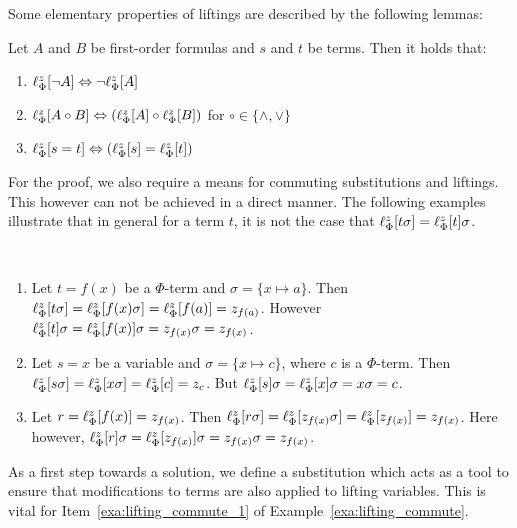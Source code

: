Some elementary properties of liftings are described by the following lemmas:


\begin{lemma}
	\label{lemma:lift_commute}
	Let $A$ and $B$ be first-order formulas and $s$ and $t$ be terms. Then it holds that:
	\begin{enumerate}
		\item $\lift{\Phi}{\lnot A}{z} \spas\semiff{} \lnot \lift{\Phi}{A}{z}$
		\item $\lift{\Phi}{A \circ B}{z} \spas\semiff{} ( \lift{\Phi}{A}{z} \circ \lift{\Phi}{B}{z} )$ for  $\circ \in \{\land, \lor\}$
		\item $\lift{\Phi}{s = t}{z} \spas\semiff{} ( \lift{\Phi}{s}{z} = \lift{\Phi}{t}{z} )$
	\end{enumerate}
\end{lemma}


For the proof, we also require a means for commuting substitutions and liftings.
This however can not be achieved in a direct manner. The following examples illustrate
that in general for a term $t$, it is not the case that
$
\lifphi{t\sigma} =
\lifphi{t}\sigma 
$.

\begin{exa}
	\label{exa:lifting_commute}
	~
	\begin{enumerate}
		\item
			\label{exa:lifting_commute_1}
			Let $t = f(x)$ be a $\Phi$-term and $\sigma = \{x \mapsto a\}$.
			Then $\lifphi{t\sigma} = \lifphi{f(x)\sigma} = \lifphi{f(a)} = z_{f(a)}$.
			However $\lifphi{t}\sigma = \lifphi{f(x)}\sigma = z_{f(x)}\sigma = z_{f(x)}$.

		\item
			Let $s=x$ be a variable and $\sigma = \{x\mapsto c\}$, where $c$ is a $\Phi$-term.
			Then $\lifphi{s\sigma} = 
			\lifphi{x\sigma} =
			\lifphi{c} = z_c$.
			But 
			$\lifphi{s}\sigma = 
			\lifphi{x}\sigma = 
			x\sigma = 
			c$.

		\item
			Let $r = \lifphi{f(x)} = z_{f(x)}$.
			Then $\lifphi{r\sigma} = \lifphi{z_{f(x)}\sigma} = \lifphi{z_{f(x)}} = z_{f(x)}$.
			Here however, $\lifphi{r}\sigma = \lifphi{z_{f(x)}}\sigma = z_{f(x)}\sigma = z_{f(x)}$.
			\qedhere
	\end{enumerate}
\end{exa}

As a first step towards a solution, we define a substitution which acts as a tool to ensure that modifications to terms are also applied to lifting variables.
This is vital for Item~\ref{exa:lifting_commute_1} of Example~\ref{exa:lifting_commute}.

